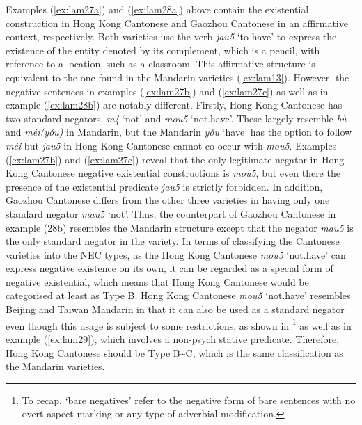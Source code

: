 \documentclass[output=paper]{langscibook}
\begin{document}
Examples (\ref{ex:lam27a}) and (\ref{ex:lam28a}) above contain the existential construction in Hong Kong Cantonese and Gaozhou Cantonese in an affirmative context, respectively. Both varieties use the verb \textit{jau5} `to have' to express the existence of the entity denoted by its complement, which is a pencil, with reference to a location, such as a classroom. This affirmative structure is equivalent to the one found in the Mandarin varieties (\ref{ex:lam13}). However, the negative sentences in examples (\ref{ex:lam27b}) and (\ref{ex:lam27c}) as well as in example (\ref{ex:lam28b}) are notably different. Firstly, Hong Kong Cantonese has two standard negators, \textit{m4} `not' and \textit{mou5} `not.have'. These largely resemble \textit{bù} and \textit{méi(yǒu)} in Mandarin, but the Mandarin \textit{yǒu} `have' has the option to follow \textit{méi} but \textit{jau5} in Hong Kong Cantonese cannot co-occur with \textit{mou5}. Examples (\ref{ex:lam27b}) and (\ref{ex:lam27c}) reveal that the only legitimate negator in Hong Kong Cantonese negative existential constructions is \textit{mou5}, but even there the presence of the existential predicate \textit{jau5} is strictly forbidden. In addition, Gaozhou Cantonese differs from the other three varieties in having only one standard negator \textit{mau5} `not'. Thus, the counterpart of Gaozhou Cantonese in example (28b) resembles the Mandarin structure except that the negator \textit{mau5} is the only standard negator in the variety. In terms of classifying the Cantonese varieties into the NEC types, as the Hong Kong Cantonese \textit{mou5} `not.have' can express negative existence on its own, it can be regarded as a special form of negative existential, which means that Hong Kong Cantonese would be categorised at least as Type B. Hong Kong Cantonese \textit{mou5} `not.have' resembles Beijing and Taiwan Mandarin in that it can also be used as a standard negator even though this usage is subject to some restrictions, as shown in \footnote{To recap, `bare negatives' refer to the negative form of bare sentences with no overt aspect-marking or any type of adverbial modification.} as well as in example (\ref{ex:lam29}), which involves a non-psych stative predicate. Therefore, Hong Kong Cantonese should be Type B\sim C, which is the same classification as the Mandarin varieties.
\end{document}
